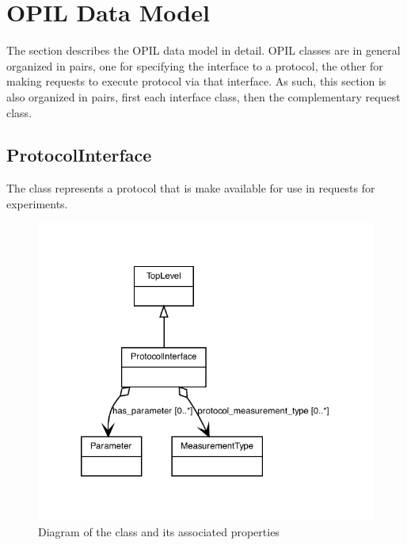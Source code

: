 
\section{OPIL Data Model}\label{sec:model}

The section describes the OPIL data model in detail.  
OPIL classes are in general organized in pairs, one for specifying the interface to a protocol, the other for making requests to execute protocol via that interface.
As such, this section is also organized in pairs, first each interface class, then the complementary request class.


\subsection{ProtocolInterface}
\label{sec:ProtocolInterface}

The  class represents a protocol that is make available for use in requests for experiments.

\begin{figure}[ht]
\begin{center}
\includegraphics[scale=0.8]{figures/ProtocolInterface}
\caption[]{Diagram of the  class and its associated properties}
\label{uml:ProtocolInterface}
\end{center}
\end{figure}

